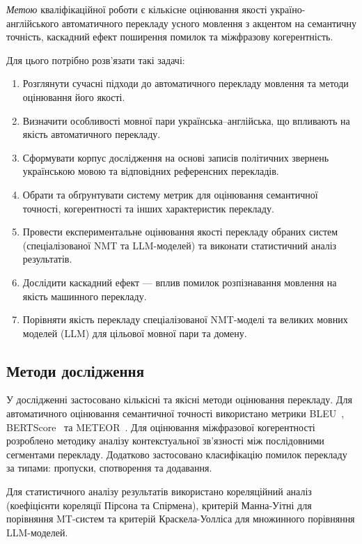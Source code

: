 \textit{Метою} кваліфікаційної роботи є кількісне оцінювання якості
україно-англійського автоматичного перекладу усного мовлення з акцентом на
семантичну точність, каскадний ефект поширення помилок та міжфразову
когерентність.

Для цього потрібно розв'язати такі задачі:
\begin{enumerate}[nosep]
    \item Розглянути сучасні підходи до автоматичного перекладу мовлення
    та методи оцінювання його якості.
    \item Визначити особливості мовної пари українська--англійська, що впливають
    на якість автоматичного перекладу.
    \item Сформувати корпус дослідження на основі записів політичних звернень
    українською мовою та відповідних референсних перекладів.
    \item Обрати та обґрунтувати систему метрик для оцінювання семантичної
    точності, когерентності та інших характеристик перекладу.
    \item Провести експериментальне оцінювання якості перекладу обраних систем
    (спеціалізованої NMT та LLM-моделей) та виконати статистичний аналіз
    результатів.
    \item Дослідити каскадний ефект --- вплив помилок розпізнавання мовлення
    на якість машинного перекладу.
    \item Порівняти якість перекладу спеціалізованої NMT-моделі та великих
    мовних моделей (LLM) для цільової мовної пари та домену.
\end{enumerate}

\subsection{Методи дослідження}

У дослідженні застосовано кількісні та якісні методи оцінювання перекладу.
Для автоматичного оцінювання семантичної точності використано метрики
BLEU~\cite{papineni_bleu}, BERTScore~\cite{bert_score}
та METEOR~\cite{banerjee_meteor}. Для оцінювання міжфразової когерентності розроблено
методику аналізу контекстуальної зв'язності між послідовними сегментами
перекладу. Додатково застосовано класифікацію помилок перекладу за типами:
пропуски, спотворення та додавання.

Для статистичного аналізу результатів використано кореляційний аналіз
(коефіцієнти кореляції Пірсона та Спірмена), критерій Манна-Уітні для
порівняння MT-систем та критерій Краскела-Уолліса для множинного
порівняння LLM-моделей.

